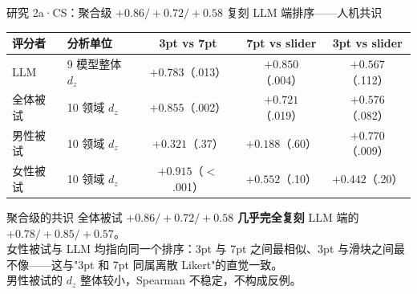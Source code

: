 \documentclass[aspectratio=169,professionalfonts]{beamer}
\begin{document}
\begin{frame}{研究 2a·CS：聚合级 $+0.86/+0.72/+0.58$ 复刻 LLM 端排序——人机共识}
  \footnotesize
  \setlength{\tabcolsep}{5pt}
  \begin{table}
    \centering
    \begin{tabular}{llccc}
      \toprule
      评分者 & 分析单位 & 3pt vs 7pt & 7pt vs slider & 3pt vs slider \\
      \midrule
      LLM     & 9 模型整体 $d_z$         & $+0.783$（.013）   & $+0.850$（.004）  & $+0.567$（.112） \\
      \midrule
      全体被试 & 10 领域 $d_z$             & $+0.855$（.002）   & $+0.721$（.019）  & $+0.576$（.082） \\
      男性被试 & 10 领域 $d_z$             & $+0.321$（.37）    & $+0.188$（.60）   & $+0.770$（.009） \\
      女性被试 & 10 领域 $d_z$             & $+0.915$（$<$.001）& $+0.552$（.10）   & $+0.442$（.20）  \\
      \bottomrule
    \end{tabular}
  \end{table}

  \vspace{0.2em}
  \begin{alertblock}{聚合级的共识}
    \small 全体被试 $+0.86 / +0.72 / +0.58$ \textbf{几乎完全复刻} LLM 端的 $+0.78 / +0.85 / +0.57$。
    \\女性被试与 LLM 均指向同一个排序：3pt 与 7pt 之间最相似、3pt 与滑块之间最不像——这与"3pt 和 7pt 同属离散 Likert"的直觉一致。
    \\男性被试的 $d_z$ 整体较小，Spearman 不稳定，不构成反例。
  \end{alertblock}
\end{frame}
\end{document}
